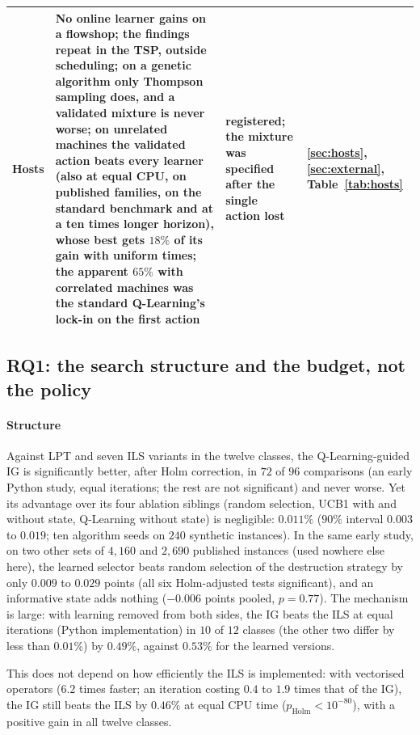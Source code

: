 \begin{table}[t]
{\begin{tabular}{@{}lp{7.0cm}p{2.8cm}l@{}}
Hosts & No online learner gains on a flowshop; the findings repeat in the TSP, outside scheduling; on a genetic algorithm only Thompson sampling does, and a validated mixture is never worse; on unrelated machines the validated action beats every learner (also at equal CPU, on published families, on the standard benchmark and at a ten times longer horizon), whose best gets $18\%$ of its gain with uniform times; the apparent $65\%$ with correlated machines was the standard Q-Learning's lock-in on the first action & registered; the mixture was specified after the single action lost & \ref{sec:hosts}, \ref{sec:external}, Table~\ref{tab:hosts} \\
\bottomrule
\end{tabular}}
\end{table}

\subsection{RQ1: the search structure and the budget, not the policy}
\label{sec:rq1}
\paragraph{Structure} Against LPT and seven ILS variants in the twelve classes, the Q-Learning-guided IG is significantly better, after Holm correction, in $72$ of $96$ comparisons (an early Python study, equal iterations; the rest are not significant) and never worse. Yet its advantage over its four ablation siblings (random selection, UCB1 with and without state, Q-Learning without state) is negligible: $0.011\%$ ($90\%$ interval $0.003$ to $0.019$; ten algorithm seeds on $240$ synthetic instances). In the same early study, on two other sets of $4{,}160$ and $2{,}690$ published instances (used nowhere else here), the learned selector beats random selection of the destruction strategy by only $0.009$ to $0.029$ points (all six Holm-adjusted tests significant), and an informative state adds nothing ($-0.006$ points pooled, $p=0.77$). The mechanism is large: with learning removed from both sides, the IG beats the ILS at equal iterations (Python implementation) in $10$ of $12$ classes (the other two differ by less than $0.01\%$) by $0.49\%$, against $0.53\%$ for the learned versions.

This does not depend on how efficiently the ILS is implemented: with vectorised operators ($6.2$ times faster; an iteration costing $0.4$ to $1.9$ times that of the IG), the IG still beats the ILS by $0.46\%$ at equal CPU time ($p_{\mathrm{Holm}}<10^{-80}$), with a positive gain in all twelve classes.

